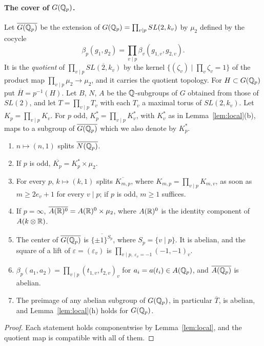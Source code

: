 \paragraph{The cover of \texorpdfstring{$G(\mathbb{Q}_p)$}{G(Qp)}.}
Let $\overline{G(\mathbb{Q}_p)}$ be the extension of $G(\mathbb{Q}_p)=\prod_{v\mid p}
SL(2,k_v)$ by $\mu_2$ defined by the cocycle
\[
\beta_p(g_1,g_2)=\prod_{v\mid p}\beta_v(g_{1,v},g_{2,v}).
\]
It is the \emph{quotient} of $\prod_{v\mid p}\overline{SL(2,k_v)}$ by
the kernel $\{(\zeta_v)\mid\prod_v\zeta_v=1\}$ of the product map
$\prod_{v\mid p}\mu_2\to\mu_2$, and it carries the quotient topology.
For $H\subset G(\mathbb{Q}_p)$ put $\overline H=p^{-1}(H)$. Let $B$, $N$, $A$ be
the $\mathbb{Q}$-subgroups of $G$ obtained from those of $SL(2)$, and let
$T=\prod_{v\mid p}T_v$ with each $T_v$ a maximal torus of $SL(2,k_v)$.
Let $K_p=\prod_{v\mid p}K_v$. For $p$ odd, $K_p^*=\prod_{v\mid p}K_v^*$,
with $K_v^*$ as in Lemma~\ref{lem:local}(b), maps to a subgroup of
$\overline{G(\mathbb{Q}_p)}$ which we also denote by $K_p^*$.

\begin{lemma}\label{lem:Qp}
\begin{enumerate}[label=(\alph*)]
\item $n\mapsto(n,1)$ splits $\overline{N(\mathbb{Q}_p)}$.
\item If $p$ is odd, $\overline{K_p}=K_p^*\times\mu_2$.
\item For every $p$, $k\mapsto(k,1)$ splits $\overline{K_{m,p}}$, where
  $K_{m,p}=\prod_{v\mid p}K_{m,v}$, as soon as $m\ge 2e_v+1$ for every
  $v\mid p$; if $p$ is odd, $m\ge1$ suffices.
\item If $p=\infty$, $\overline{A(\mathbb{R})^0}=A(\mathbb{R})^0\times\mu_2$, where
  $A(\mathbb{R})^0$ is the identity component of $A(k\otimes\mathbb{R})$.
\item The center of $\overline{G(\mathbb{Q}_p)}$ is
  $\overline{\{\pm1\}^{S_p}}$, where $S_p=\{v\mid p\}$. It is abelian,
  and the square of a lift of $\varepsilon=(\varepsilon_v)$ is
  $\prod_{v\mid p,\ \varepsilon_v=-1}(-1,-1)_v$.
\item $\beta_p(a_1,a_2)=\prod_{v\mid p}(t_{1,v},t_{2,v})_v$ for
  $a_i=a(t_i)\in A(\mathbb{Q}_p)$, and $\overline{A(\mathbb{Q}_p)}$ is abelian.
\item The preimage of any abelian subgroup of $G(\mathbb{Q}_p)$, in particular
  $\overline T$, is abelian, and Lemma~\ref{lem:local}(h) holds for
  $G(\mathbb{Q}_p)$.
\end{enumerate}
\end{lemma}

\begin{proof}
Each statement holds componentwise by Lemma~\ref{lem:local}, and the
quotient map is compatible with all of them.
\end{proof}

